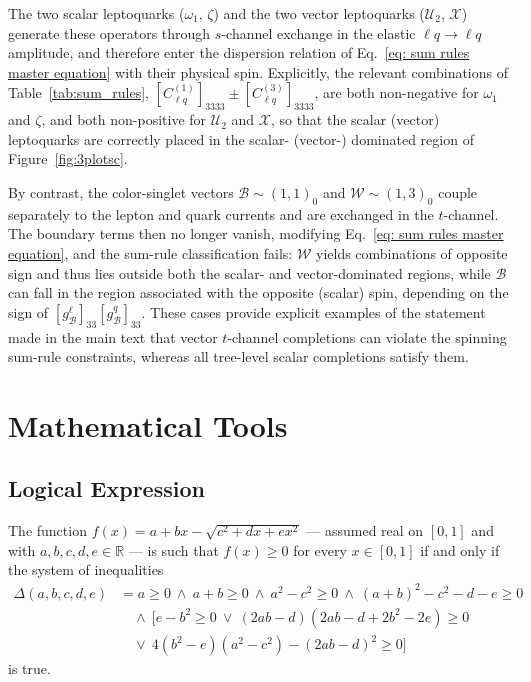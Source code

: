 \begin{subappendices}
The two scalar leptoquarks ($\omega_1$, $\zeta$) and the two vector leptoquarks
($\mathcal{U}_2$, $\mathcal{X}$) generate these operators through $s$-channel
exchange in the elastic $\ell q \to \ell q$ amplitude, and therefore enter the
dispersion relation of Eq.~\eqref{eq: sum rules master equation} with their physical
spin. 
Explicitly, the relevant combinations of Table~\ref{tab:sum_rules},
$[C_{\ell q}^{(1)}]_{3333} \pm [C_{\ell q}^{(3)}]_{3333}$, are both non-negative for
$\omega_1$ and $\zeta$, and both non-positive for $\mathcal{U}_2$ and $\mathcal{X}$,
so that the scalar (vector) leptoquarks are correctly placed in the scalar-
(vector-) dominated region of Figure~\ref{fig:3plotsc}.

By contrast, the color-singlet vectors $\mathcal{B} \sim (1,1)_0$ and
$\mathcal{W} \sim (1,3)_0$ couple separately to the lepton and quark currents and are exchanged in the $t$-channel. The boundary terms then no longer vanish, modifying Eq.~\eqref{eq: sum rules master equation}, and the sum-rule
classification fails: $\mathcal{W}$ yields combinations of opposite sign and thus
lies outside both the scalar- and vector-dominated regions, while $\mathcal{B}$ can
fall in the region associated with the opposite (scalar) spin, depending on the sign
of $[g_{\mathcal B}^\ell]_{33}[g_{\mathcal B}^q]_{33}$. These cases provide explicit
examples of the statement made in the main text that vector $t$-channel completions
can violate the spinning sum-rule constraints, whereas all tree-level scalar
completions satisfy them.

\section{Mathematical Tools}

\subsection{Logical Expression}\label{sec:appendix, logical expression}

The function $f(x) = a + bx - \sqrt{c^2 + dx + ex^2}$ --- assumed real on $[0,1]$ and with $a,b,c,d,e\in\mathbb{R}$ --- is such that $f(x) \ge 0$ for every $x \in [0,1]$ if and only if the system of inequalities
\begin{align}
    \Delta(a,b,c,d,e) &= 
    a \ge 0 
    \ \land \
    a+b \ge 0
    \ \land \ 
    a^2 - c^2 \ge 0
    \ \land \ 
    (a+b)^2 - c^2 -d-e \ge 0 \nonumber
    \\& \quad
    \land \
    [e - b^2 \ge 0 \ \lor\  (2ab-d)(2ab-d+2b^2-2e) \ge 0 \nonumber 
    \\& \quad
    \lor \ 4(b^2-e)(a^2-c^2)-(2ab-d)^2 \ge 0]
\end{align}
is true.


\end{subappendices}

